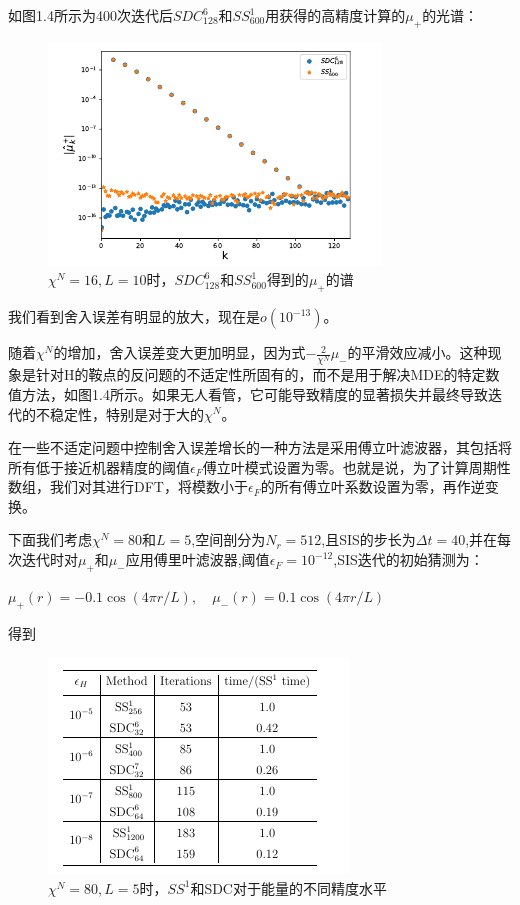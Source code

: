 如图1.4所示为400次迭代后$SDC_{128}^6$和$SS_{600}^1$用获得的高精度计算的$\mu_{+}$的光谱：
\begin{figure}[ht]
	\centering
	\includegraphics[scale=1]{5.png}
	\caption{$\chi^N=16,L=10$时，$SDC_{128}^6$和$SS_{600}^1$得到的$\mu_{+}$的谱}
	\label{fig:pathdemo}
\end{figure}
我们看到舍入误差有明显的放大，现在是$o(10^{-13})$。

随着$\chi^N$的增加，舍入误差变大更加明显，因为式$-\frac{2}{\chi^N} \mu_{-}$的平滑效应减小。这种现象是针对H的鞍点的反问题的不适定性所固有的，而不是用于解决MDE的特定数值方法，如图1.4所示。如果无人看管，它可能导致精度的显著损失并最终导致迭代的不稳定性，特别是对于大的$\chi^N$。

在一些不适定问题中控制舍入误差增长的一种方法是采用傅立叶滤波器，其包括将所有低于接近机器精度的阈值$\epsilon_F$傅立叶模式设置为零。也就是说，为了计算周期性数组，我们对其进行DFT，将模数小于$\epsilon_F$的所有傅立叶系数设置为零，再作逆变换。


下面我们考虑$\chi^N=80$和$L=5$,空间剖分为$N_r=512$,且SIS的步长为$\Delta t=40$,并在每次迭代时对$\mu_{+}$和$\mu_{-}$应用傅里叶滤波器,阈值$\epsilon_F=10^{-12}$,SIS迭代的初始猜测为：

$\mu_{+}(r)=-0.1 \cos (4 \pi r / L), \quad \mu_{-}(r)=0.1 \cos (4 \pi r / L)$

得到
\begin{figure}[ht]
	\centering
	\includegraphics[scale=1]{6.png}
	\caption{$\chi^N=80,L=5$时，$SS^1$和SDC对于能量的不同精度水平}
	\label{fig:pathdemo}
\end{figure}

